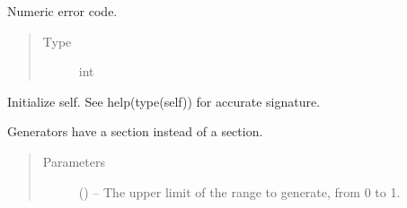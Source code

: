 \documentclass[letterpaper,10pt,english]{sphinxmanual}
\begin{document}
\begin{description}
\begin{fulllineitems}
\begin{fulllineitems}
\begin{quote}
\begin{description}
\end{description}\end{quote}

\end{fulllineitems}


\begin{fulllineitems}
\label{\detokenize{autogen:example_docstring.ExampleError.code}}
Numeric error code.
\begin{quote}\begin{description}
\item[{Type}] \leavevmode
int

\end{description}\end{quote}

\end{fulllineitems}


\begin{fulllineitems}
\label{\detokenize{autogen:example_docstring.ExampleError.__init__}}
Initialize self.  See help(type(self)) for accurate signature.

\end{fulllineitems}


\end{fulllineitems}


\begin{fulllineitems}
\label{\detokenize{autogen:example_docstring.example_generator}}
Generators have a  section instead of a  section.
\begin{quote}\begin{description}
\item[{Parameters}] \leavevmode
{} () – The upper limit of the range to generate, from 0 to  \sphinxhyphen{} 1.


\end{description}
\end{quote}
\end{fulllineitems}
\end{description}
\end{document}
